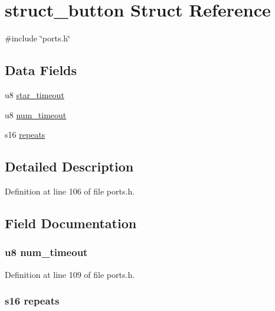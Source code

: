 \hypertarget{structstruct__button}{\section{struct\-\_\-button \-Struct \-Reference}
\label{structstruct__button}
}


{\ttfamily \#include \char`\"{}ports.\-h\char`\"{}}

\subsection*{\-Data \-Fields}
\begin{DoxyCompactItemize}
\item 
u8 \hyperlink{structstruct__button_a1b529be95d311858f31847dc3b73b7d1}{star\-\_\-timeout}
\item 
u8 \hyperlink{structstruct__button_a40c04495d947cf345335a3829c5d7205}{num\-\_\-timeout}
\item 
s16 \hyperlink{structstruct__button_af23e2219d25e6d230b9098039e4ebeec}{repeats}
\end{DoxyCompactItemize}


\subsection{\-Detailed \-Description}


\-Definition at line 106 of file ports.\-h.



\subsection{\-Field \-Documentation}
\hypertarget{structstruct__button_a40c04495d947cf345335a3829c5d7205}{
\subsubsection[{num\-\_\-timeout}]{\setlength{\rightskip}{0pt plus 5cm}u8 {\bf num\-\_\-timeout}}}\label{structstruct__button_a40c04495d947cf345335a3829c5d7205}


\-Definition at line 109 of file ports.\-h.

\hypertarget{structstruct__button_af23e2219d25e6d230b9098039e4ebeec}{
\subsubsection[{repeats}]{\setlength{\rightskip}{0pt plus 5cm}s16 {\bf repeats}}}\label{structstruct__button_af23e2219d25e6d230b9098039e4ebeec}


